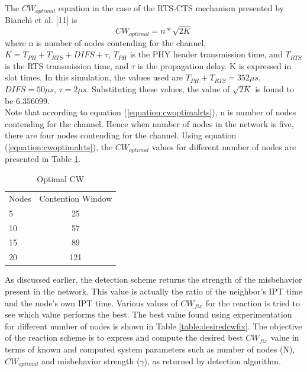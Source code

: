 \documentclass[12pt,letterpaper,english]{article}
\begin{document}
The $CW_{optimal}$ equation in the case of the RTS-CTS mechanism presented by Bianchi et al. 
[11] 
is
\begin{equation}
\label{equation:cwoptimalrts}
CW_{optimal} = n * \sqrt{2K}
\end{equation}
where n is number of nodes contending for the channel, $K = T_{PH} + T_{RTS} + DIFS + \tau$, $T_{PH}$ is the PHY header transmission time, and $T_{RTS}$ is the RTS transmission time, and $\tau$ is the propagation delay. K is expressed in slot times. In this simulation, the values used are 
$T_{PH} + T_{RTS} = 352 \mu s$, 
$DIFS = 50 \mu s$, 
$\tau = 2 \mu s$.
Substituting these values, the value of $\sqrt{2K}$ is found to be $6.356099$.
\\
\indent Note that according to equation (\ref{equation:cwoptimalrts}), n is number of nodes contending for the channel. Hence when number of nodes in the network is five, there are four nodes contending for the channel. Using equation (\ref{equation:cwoptimalrts}), the $CW_{optimal}$ values for different number of nodes are presented in Table \ref{table:optimalcw}.   
\begin{table}[H]
\caption{Optimal CW}
\label{table:optimalcw}
\begin{center}
\begin{tabular}{l c}
\hline
\hline
Nodes & Contention Window\\
5 & 25\\
10 & 57\\
15 & 89\\
20 & 121\\
\hline
\end{tabular}
\end{center}
\end{table}
As discussed earlier, the detection scheme returns the strength of the misbehavior present in the network. This value is actually the ratio of the neighbor's IPT time and the node's own IPT time. 
Various values of $CW_{fix}$ for the reaction is tried to see which value performs the best. The best value found using experimentation for different number of nodes is shown in Table \ref{table:desiredcwfix}.
The objective of the reaction scheme is to express and compute the desired best $CW_{fix}$ value in terms of known and computed system parameters such as number of nodes (N), $CW_{optimal}$ and misbehavior strength ($\gamma$), as returned by detection algorithm.
\end{document}
